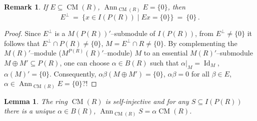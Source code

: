 \documentclass[a4paper,11pt]{article}
\newtheorem{lemma}[defi]{Lemma}
\newtheorem{rem}[defi]{Remark}
\DeclareMathOperator{\Id}{Id}
\DeclareMathOperator{\CM}{CM}
\DeclareMathOperator{\Ann}{Ann}
\begin{document}
\begin{rem} 
If ${E\subseteq \CM(R)}$, ${\Ann_{\CM(R)} E=\{0\}}$, then 
\[
E^{\perp}\ =\ \{x\in I(P(R))\mid E x=\{0\}\}\ =\ \{0\}\,.
\]
\end{rem}

\begin{proof}
Since $E^{\perp}$ is a $M(P(R))'$--submodule of $I(P(R))$, from 
${E^{\perp}\ne \{0\}}$ it follows that ${E^{\perp}\cap P(R)\ne \{0\}}$, 
${M=E^{\perp}\cap R\ne \{0\}}$. By complementing the $M(R)'$--module 
($M^{P(R)}(R)'$--module) $M$ to an essential $M(R)'$--submodule 
${M\oplus M'\subseteq P(R)}$, one can choose ${\alpha\in B(R)}$ such 
that ${\alpha|_M=\Id_M}$, ${\alpha(M)'=\{0\}}$. Consequently, 
${\alpha \beta(M\oplus M')=\{0\}}$, ${\alpha \beta=0}$ for all 
${\beta\in E}$, ${\alpha\in \Ann_{\CM(R)} E=\{0\}}$?!
\end{proof}

\begin{lemma}
The ring $\CM(R)$ is self-injective and for any ${S\subseteq I(P(R))}$ there 
is a unique ${\alpha\in B(R)}$, ${\Ann_{\CM(R)} S=\alpha \CM(R)}$.
\end{lemma}
\end{document}
